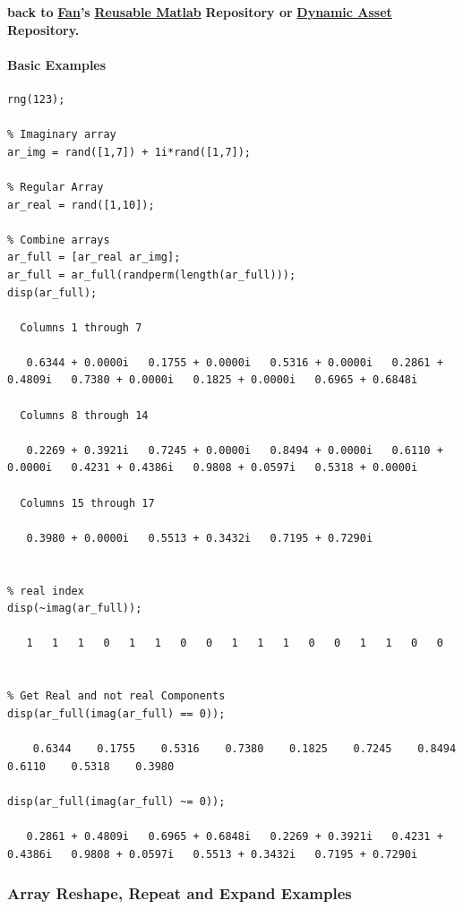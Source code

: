 \documentclass[
]{book}
\begin{document}
\textbf{back to} \href{https://fanwangecon.github.io}{\textbf{Fan}}\textbf{'s} \href{https://fanwangecon.github.io/M4Econ/}{\textbf{Reusable
Matlab}} \textbf{Repository or}
\href{https://fanwangecon.github.io/CodeDynaAsset/}{\textbf{Dynamic Asset}}
\textbf{Repository.}

\hypertarget{basic-examples}{%
\paragraph{Basic Examples}\label{basic-examples}}

\begin{verbatim}
rng(123);

% Imaginary array
ar_img = rand([1,7]) + 1i*rand([1,7]);

% Regular Array
ar_real = rand([1,10]);

% Combine arrays
ar_full = [ar_real ar_img];
ar_full = ar_full(randperm(length(ar_full)));
disp(ar_full);

  Columns 1 through 7

   0.6344 + 0.0000i   0.1755 + 0.0000i   0.5316 + 0.0000i   0.2861 + 0.4809i   0.7380 + 0.0000i   0.1825 + 0.0000i   0.6965 + 0.6848i

  Columns 8 through 14

   0.2269 + 0.3921i   0.7245 + 0.0000i   0.8494 + 0.0000i   0.6110 + 0.0000i   0.4231 + 0.4386i   0.9808 + 0.0597i   0.5318 + 0.0000i

  Columns 15 through 17

   0.3980 + 0.0000i   0.5513 + 0.3432i   0.7195 + 0.7290i


% real index
disp(~imag(ar_full));

   1   1   1   0   1   1   0   0   1   1   1   0   0   1   1   0   0


% Get Real and not real Components
disp(ar_full(imag(ar_full) == 0));

    0.6344    0.1755    0.5316    0.7380    0.1825    0.7245    0.8494    0.6110    0.5318    0.3980

disp(ar_full(imag(ar_full) ~= 0));

   0.2861 + 0.4809i   0.6965 + 0.6848i   0.2269 + 0.3921i   0.4231 + 0.4386i   0.9808 + 0.0597i   0.5513 + 0.3432i   0.7195 + 0.7290i
\end{verbatim}

\hypertarget{array-reshape-repeat-and-expand-examples}{%
\subsubsection{Array Reshape, Repeat and Expand Examples}\label{array-reshape-repeat-and-expand-examples}}
\end{document}
